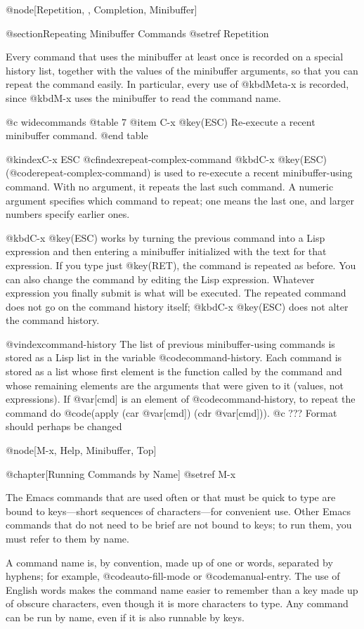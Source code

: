 {{{{@node[Repetition, , Completion, Minibuffer]

@section{Repeating Minibuffer Commands}
@setref Repetition

  Every command that uses the minibuffer at least once is recorded on a
special history list, together with the values of the minibuffer arguments,
so that you can repeat the command easily.  In particular, every
use of @kbd{Meta-x} is recorded, since @kbd{M-x} uses the minibuffer to
read the command name.

@c widecommands
@table 7
@item C-x @key(ESC)
Re-execute a recent minibuffer command.
@end table

@kindex{C-x ESC}
@cfindex{repeat-complex-command}
  @kbd{C-x @key(ESC)} (@code{repeat-complex-command}) is used to
re-execute a recent minibuffer-using command.  With no argument, it repeats
the last such command.  A numeric argument specifies which command to
repeat; one means the last one, and larger numbers specify earlier ones.

  @kbd{C-x @key(ESC)} works by turning the previous command into a Lisp
expression and then entering a minibuffer initialized with the text for that
expression.  If you type just @key(RET), the command is repeated as before.
You can also change the command by editing the Lisp expression.  Whatever
expression you finally submit is what will be executed.  The repeated command
does not go on the command history itself; @kbd{C-x @key(ESC)} does not
alter the command history.

@vindex{command-history}
  The list of previous minibuffer-using commands is stored as a Lisp list
in the variable @code{command-history}.  Each command is stored as a list
whose first element is the function called by the command and whose
remaining elements are the arguments that were given to it (values, not
expressions).  If @var[cmd] is an element of @code{command-history},
to repeat the command do @code{(apply (car @var[cmd]) (cdr @var[cmd]))}.
@c ??? Format should perhaps be changed

@node[M-x, Help, Minibuffer, Top]

@chapter[Running Commands by Name]
@setref M-x

  The Emacs commands that are used often or that must be quick to type are
bound to keys---short sequences of characters---for convenient use.  Other
Emacs commands that do not need to be brief are not bound to keys; to run
them, you must refer to them by name.

  A command name is, by convention, made up of one or words, separated by
hyphens; for example, @code{auto-fill-mode} or @code{manual-entry}.  The
use of English words makes the command name easier to remember than a key
made up of obscure characters, even though it is more characters to type.
Any command can be run by name, even if it is also runnable by keys.

}}}}

